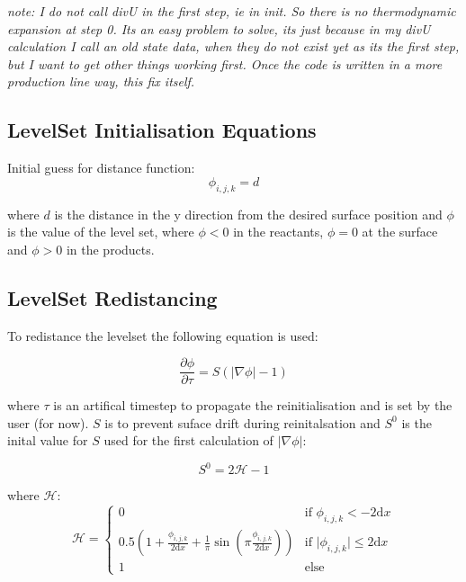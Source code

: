 \documentclass[12pt]{report}
\begin{document}
\textit{note: I do not call divU in the first step, ie in init. So there is no thermodynamic expansion at step 0. Its an easy problem to solve, its just because in my divU calculation I call an old state data, when they do not exist yet as its the first step, but I want to get other things working first. Once the code is written in a more production line way, this fix itself.}

\subsection*{LevelSet Initialisation Equations}

Initial guess for distance function:
\begin{equation}
  \phi_{i,j,k} = d
  \label{init-phi}
\end{equation}

where $d$ is the distance in the y direction from the desired surface position and $\phi$ is the value of the level set, where $\phi < 0$ in the reactants, $\phi = 0$ at the surface and $\phi > 0$ in the products.


\subsection*{LevelSet Redistancing}

To redistance the levelset the following equation is used:

\begin{equation}
  \frac{\partial \phi}{\partial \tau} = S (\lvert \nabla \phi \rvert - 1)
  \label{re-init}
\end{equation}

where $\tau$ is an artifical timestep to propagate the reinitialisation and is set by the user (for now). $S$ is to prevent suface drift during reinitalsation and $S^0$ is the inital value for $S$ used for the first calculation of $\lvert \nabla \phi \rvert$:

\begin{equation}
  S^0 = 2 \mathcal{H} - 1
  \label{calc-S0}
\end{equation}

where $\mathcal{H}$:
\begin{equation}
  \mathcal{H} =
  \begin{cases}
    0 & \text{if } \phi_{i,j,k} < -2\text{d}x \\
    0.5 \left(1 + \frac{\phi_{i,j,k}}{2 \text{d}x} + \frac{1}{\pi} \sin \left(\pi \frac{\phi_{i,j,k}}{2 \text{d}x} \right) \right) & \text{if } \lvert \phi_{i,j,k} \rvert \leq 2 \text{d}x \\
    1 & \text{else}
  \end{cases}
  \label{calc-S0-h}
\end{equation}
\end{document}
